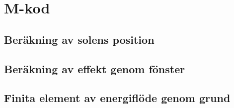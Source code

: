 \newpage
\chapter{M-kod}
\label{sec:mcode}


\section{Beräkning av solens position}\label{app:sunposition}



\section{Beräkning av effekt genom fönster}\label{app:sunwindows}






\section{Finita element av energiflöde genom grund}\label{app:femfoundation}








